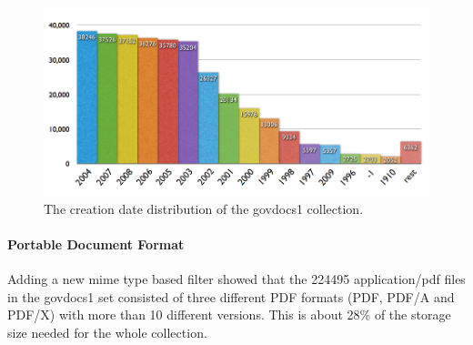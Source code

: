
\begin{figure}[th]
\begin{center}
\includegraphics[width=\textwidth]{figures/usecases/govdocs1/created_govdocs1.png}
\caption{The creation date distribution of the govdocs1 collection.}
\label{fig:govdocs1_created}
\end{center}
\end{figure}

\paragraph{Portable Document Format}
Adding a new mime type based filter showed that the 224495 application/pdf files in the govdocs1 set consisted of three different PDF formats (PDF, PDF/A and PDF/X) with more than 10 different versions.
This is about 28\% of the storage size  needed for the whole collection.

